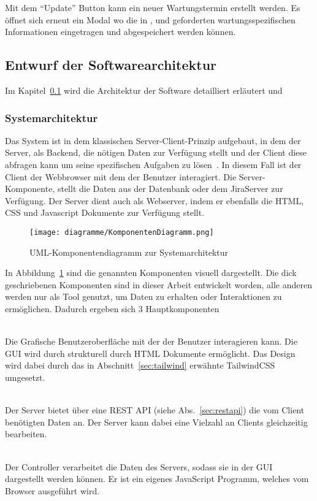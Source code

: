 Mit dem ``Update'' Button kann ein neuer Wartungstermin erstellt werden.
Es öffnet sich erneut ein Modal wo die in , 
 und  geforderten wartungsspezifischen
Informationen eingetragen und abgespeichert werden können.


\subsection{Entwurf der Softwarearchitektur}\label{sec:swArchitectur}
Im Kapitel~\ref{sec:swArchitectur} wird die Architektur der Software detailliert 
erläutert und 

\subsubsection{Systemarchitektur}
Das System ist in dem klassischen Server-Client-Prinzip aufgebaut, in dem der Server, 
als \gls{Backend}, die nötigen Daten zur Verfügung stellt und der Client diese 
abfragen kann um seine spezifischen Aufgaben zu lösen~\cite{Nie13}.
In diesem Fall ist der Client der Webbrowser mit dem der Benutzer interagiert. 
Die Server-Komponente, stellt die Daten aus der Datenbank oder dem JiraServer
zur Verfügung. Der Server dient auch als Webserver, indem er ebenfalls die
\gls{HTML}, \gls{CSS} und Javascript Dokumente zur Verfügung stellt.\\

\begin{figure}[H]
    \texttt{[image: diagramme/KomponentenDiagramm.png]}
    \caption{UML-Komponentendiagramm zur Systemarchitektur}\label{fig:components}
\end{figure}

In Abbildung~\ref{fig:components} sind die genannten Komponenten visuell dargestellt.
Die dick geschriebenen Komponenten sind in dieser Arbeit entwickelt worden, alle
anderen werden nur als Tool genutzt, um Daten zu erhalten oder Interaktionen zu 
ermöglichen. Dadurch ergeben sich 3 Hauptkomponenten

\begin{description}
    \hfill\\
    Die Grafische Benutzeroberfläche mit der der Benutzer interagieren kann.
    Die \gls{GUI} wird durch strukturell durch \gls{HTML} Dokumente ermöglicht. 
    Das Design wird dabei durch das in Abschnitt~\ref{sec:tailwind} erwähnte 
    TailwindCSS umgesetzt.

    \hfill\\
    Der Server bietet über eine \gls{REST} \gls{API} (siehe Abs.~\ref{sec:restapi})
    die vom Client benötigten Daten an. Der Server kann dabei eine Vielzahl an Clients
    gleichzeitig bearbeiten.

    \hfill\\
    Der Controller verarbeitet die Daten des Servers, sodass sie in der GUI
    dargestellt werden können. Er ist ein eigenes JavaScript Programm,
    welches vom Browser ausgeführt wird.\\
\end{description}

